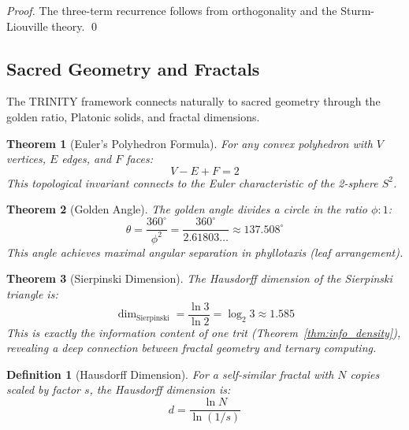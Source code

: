 \documentclass[aps,prd,preprint,superscriptaddress,showpacs,nofootinbib,longbibliography]{revtex4-2}
\newtheorem{theorem}{Theorem}
\newtheorem{definition}{Definition}
\begin{document}
\begin{proof}
The three-term recurrence follows from orthogonality and the Sturm-Liouville theory. \qed
\end{proof}

\subsection{Sacred Geometry and Fractals}
\label{sec:geometry}

The TRINITY framework connects naturally to sacred geometry through the golden ratio, Platonic solids, and fractal dimensions.

\begin{theorem}[Euler's Polyhedron Formula]
\label{thm:euler}
For any convex polyhedron with $V$ vertices, $E$ edges, and $F$ faces:
\begin{equation}
V - E + F = 2
\end{equation}
This topological invariant connects to the Euler characteristic of the 2-sphere $S^2$.
\end{theorem}

\begin{theorem}[Golden Angle]
\label{thm:golden_angle}
The golden angle divides a circle in the ratio $\phi : 1$:
\begin{equation}
\theta = \frac{360^\circ}{\phi^2} = \frac{360^\circ}{2.61803\ldots} \approx 137.508^\circ
\end{equation}
This angle achieves maximal angular separation in phyllotaxis (leaf arrangement).
\end{theorem}

\begin{theorem}[Sierpinski Dimension]
\label{thm:sierpinski}
The Hausdorff dimension of the Sierpinski triangle is:
\begin{equation}
\dim_{\text{Sierpinski}} = \frac{\ln 3}{\ln 2} = \log_2 3 \approx 1.585
\end{equation}
This is exactly the information content of one trit (Theorem~\ref{thm:info_density}), revealing a deep connection between fractal geometry and ternary computing.
\end{theorem}

\begin{definition}[Hausdorff Dimension]
\label{def:hausdorff}
For a self-similar fractal with $N$ copies scaled by factor $s$, the Hausdorff dimension is:
\begin{equation}
d = \frac{\ln N}{\ln(1/s)}
\end{equation}
\end{definition}
\end{document}
